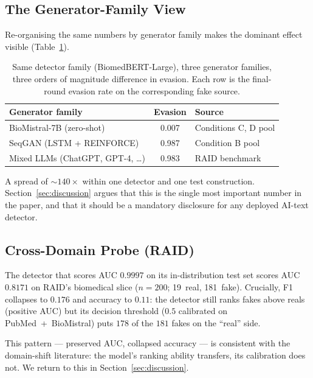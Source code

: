 \documentclass[conference]{IEEEtran}
\begin{document}
\subsection{The Generator-Family View}
\label{ssec:family}

Re-organising the same numbers by generator family makes the dominant
effect visible (Table~\ref{tab:family}).

\begin{table}[t]
\caption{Same detector family (BiomedBERT-Large), three generator
families, three orders of magnitude difference in evasion. Each row is
the final-round evasion rate on the corresponding fake source.}
\label{tab:family}
\centering
\renewcommand{\arraystretch}{1.15}
\begin{tabular}{@{}lcl@{}}
\toprule
\textbf{Generator family} & \textbf{Evasion} & \textbf{Source} \\
\midrule
BioMistral-7B (zero-shot)        & 0.007 & Conditions C, D pool \\
SeqGAN (LSTM + REINFORCE)        & 0.987 & Condition B pool \\
Mixed LLMs (ChatGPT, GPT-4, \dots) & 0.983 & RAID benchmark \\
\bottomrule
\end{tabular}
\end{table}

A spread of $\sim$\(140\times\) within one detector and one test
construction. Section~\ref{sec:discussion} argues that this is the
single most important number in the paper, and that it should be a
mandatory disclosure for any deployed AI-text detector.

\subsection{Cross-Domain Probe (RAID)}
\label{ssec:raid_results}

The detector that scores AUC \(0.9997\) on its in-distribution test set
scores AUC \(0.8171\) on RAID's biomedical slice
(\(n = 200\); 19~real, 181~fake). Crucially, F1 collapses to \(0.176\)
and accuracy to \(0.11\): the detector still ranks fakes above reals
(positive AUC) but its decision threshold (\(0.5\) calibrated on
PubMed~+~BioMistral) puts \(178\) of the \(181\) fakes on the
``real'' side.

This pattern — preserved AUC, collapsed accuracy — is consistent with the
domain-shift literature: the model's ranking ability transfers, its
calibration does not. We return to this in Section~\ref{sec:discussion}.
\end{document}
